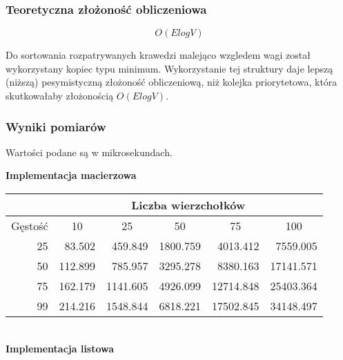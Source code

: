 \documentclass[12pt]{article}
\begin{document}
\subsubsection{Teoretyczna złożoność obliczeniowa}

{\Large\[ O(E log V) \]}

\normalfont
\normalsize
Do sortowania rozpatrywanych krawedzi malejąco wzgledem wagi został wykorzystany kopiec typu minimum. Wykorzystanie tej struktury daje lepszą  (niższą) pesymistyczną złożoność obliczeniową, niż kolejka priorytetowa, która skutkowałaby złożonością \( O(E log V) \).

\subsubsection{Wyniki pomiarów}

Wartości podane są w mikrosekundach.

\textbf{Implementacja macierzowa}
\begin{center}
\begin{tabular}{|r|r|r|r|r|r|}
\hline
                              & \multicolumn{5}{c|}{Liczba wierzchołków}                                                                                         \\ \hline
\multicolumn{1}{|c|}{Gęstość} & \multicolumn{1}{c|}{10} & \multicolumn{1}{c|}{25} & \multicolumn{1}{c|}{50} & \multicolumn{1}{c|}{75} & \multicolumn{1}{c|}{100} \\ \hline
25                            & 83.502                  & 459.849                 & 1800.759                & 4013.412                & 7559.005                 \\ \hline
50                            & 112.899                 & 785.957                 & 3295.278                & 8380.163                & 17141.571                \\ \hline
75                            & 162.179                 & 1141.605                & 4926.099                & 12714.848               & 25403.364                \\ \hline
99                            & 214.216                 & 1548.844                & 6818.221                & 17502.845               & 34148.497                \\ \hline
\end{tabular}
\end{center}
\\
\vspace{10mm}
\newpage
\textbf{Implementacja listowa}
\end{document}
